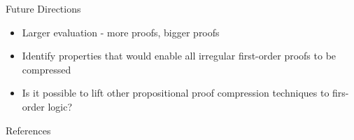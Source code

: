 \documentclass[final]{beamer} %
\begin{document}
\begin{frame}{}
\begin{columns}
\begin{column}{0.3\textwidth}
    
          \begin{block}{Future Directions}
    \begin{itemize}
    \item Larger evaluation - more proofs, bigger proofs
    \item Identify properties that would enable all irregular first-order proofs to be compressed
    \item Is it possible to lift other propositional proof compression techniques to firs-order logic?
    \end{itemize}
    	\end{block}
    
      \begin{block}{References}


    \end{block}    
        \vfill
  \end{column}
\end{columns}


    
  \end{frame}
\end{document}
